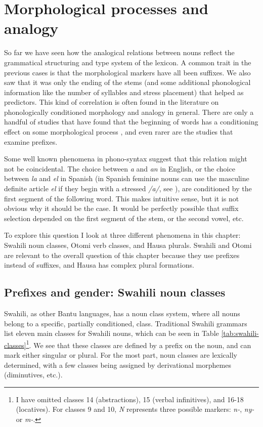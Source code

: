 \chapter{Morphological processes and analogy}\label{chap:structural}

So far we have seen how the analogical relations between nouns reflect the grammatical structuring and type system of the lexicon. A common trait in the previous cases is that the morphological markers have all been suffixes. We also saw that it was only the ending of the stems (and some additional phonological information like the number of syllables and stress placement) that helped as predictors. This kind of correlation is often found in the literature on phonologically conditioned morphology and analogy in general. There are only a handful of studies that have found that the beginning of words has a conditioning effect on some morphological process \autocite{Bybee.1982, Kopcke.1984}, and even rarer are the studies that examine prefixes.

Some well known phenomena in phono-syntax suggest that this relation might not be coincidental. The choice between \textit{a} and \textit{an} in English, or the choice between \textit{la} and \textit{el} in Spanish (in Spanish feminine nouns can use the masculine definite article \textit{el} if they begin with a stressed \textit{/a/}, see \textcite{Harris.1987}), are conditioned by the first segment of the following word. This makes intuitive sense, but it is not obvious why it should be the case. It would be perfectly possible that suffix selection depended on the first segment of the stem, or the second vowel, etc.

To explore this question I look at three different phenomena in this chapter: Swahili noun classes, Otomi verb classes, and Hausa plurals. Swahili and Otomi are relevant to the overall question of this chapter because they use prefixes instead of suffixes, and Hausa has complex plural formations. %

\section{Prefixes and gender: Swahili noun classes}


Swahili, as other Bantu languages, has a noun class system, where all nouns belong to a specific, partially conditioned, class. Traditional Swahili grammars list eleven main classes for Swahili nouns, which can be seen in Table \ref{tab:swahili-classes}\footnote{I have omitted classes 14 (abstractions), 15 (verbal infinitives), and 16-18 (locatives). For classes 9 and 10, \textit{N} represents three possible markers: \textit{n-}, \textit{ny-} or \textit{m-}.}. We see that these classes are defined by a prefix on the noun, and can mark either singular or plural. For the most part, noun classes are lexically determined, with a few classes being assigned by derivational morphemes (diminutives, etc.). %

